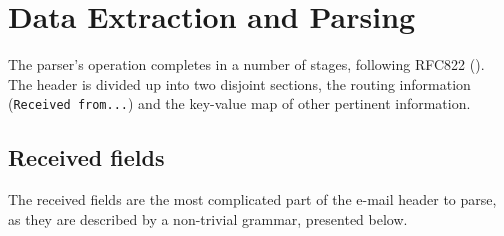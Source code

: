 \section{Data Extraction and Parsing}

The parser's operation completes in a number of stages, following RFC822
(\cite{RFC0822}).  The header is divided up into two disjoint sections, the
routing information (\texttt{Received from...}) and the key-value map of other
pertinent information.

\subsection{Received fields}\label{sec:par}

The received fields are the most complicated part of the e-mail header to parse,
as they are described by a non-trivial grammar, presented below.

